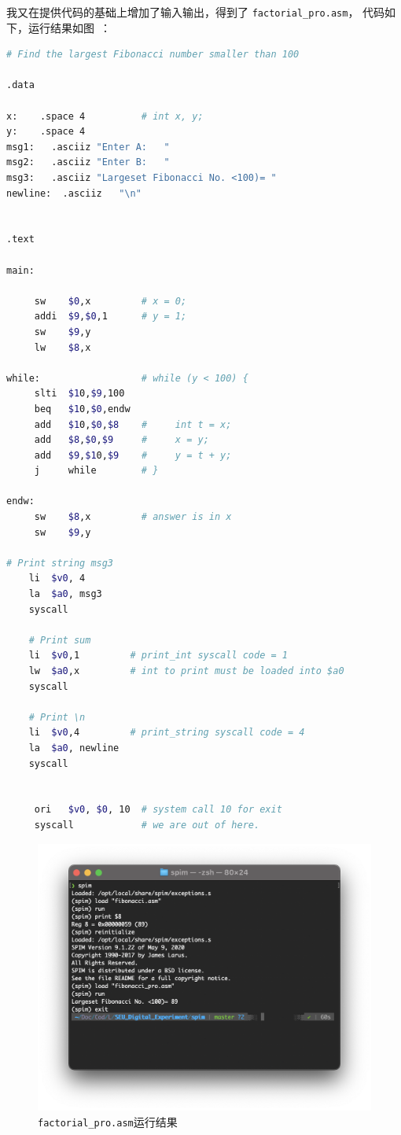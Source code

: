 \documentclass[11pt]{SEU-Digital-Report}
\begin{document}
      我又在提供代码的基础上增加了输入输出，得到了 \texttt{factorial\_pro.asm}，
      代码如下，运行结果如图~：
      \begin{lstlisting}[language=sh,tabsize=5,morekeywords={
        j,la,li,syscall,move,sll,sub,bge,sll,add,sw,addi,jal,ls,subu,jr,lw,bgt,bne,lbu,lb,sb,beq,slti,ori
      },title={factorial\_pro.asm}]
# Find the largest Fibonacci number smaller than 100

.data

x:    .space 4          # int x, y;
y:    .space 4
msg1:	.asciiz	"Enter A:   "
msg2:	.asciiz	"Enter B:   "
msg3:	.asciiz	"Largeset Fibonacci No. <100)= "
newline:  .asciiz	"\n"


.text

main:

     sw    $0,x         # x = 0;
     addi  $9,$0,1      # y = 1;
     sw    $9,y
     lw    $8,x

while:                  # while (y < 100) {
     slti  $10,$9,100
     beq   $10,$0,endw
     add   $10,$0,$8    #     int t = x;
     add   $8,$0,$9     #     x = y;
     add   $9,$10,$9    #     y = t + y;
     j     while        # }

endw:
     sw    $8,x         # answer is in x
     sw    $9,y

# Print string msg3
	li	$v0, 4
	la	$a0, msg3
	syscall

	# Print sum
	li	$v0,1         # print_int syscall code = 1
	lw	$a0,x         # int to print must be loaded into $a0
	syscall

	# Print \n
	li	$v0,4         # print_string syscall code = 4
	la	$a0, newline
	syscall


     ori   $v0, $0, 10  # system call 10 for exit
     syscall            # we are out of here.

      \end{lstlisting}

      \begin{figure}[htbp]
        \centering
        \includegraphics[width=.6\linewidth]{fig/spim_fibonacci_pro.png}
        \caption{\texttt{factorial\_pro.asm}运行结果}
      \end{figure}
\end{document}
